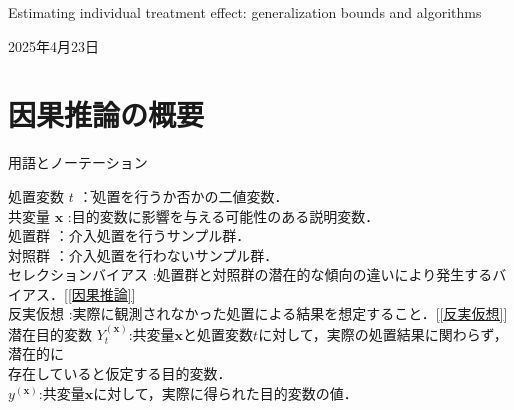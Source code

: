 \documentclass[dvipdfmx]{jreport}
\begin{document}
\begin{center}
    \large{Estimating individual treatment effect: generalization bounds and algorithms}
\end{center}

\begin{flushright}
    2025年4月23日
\end{flushright}

\section{因果推論の概要}
\begin{itembox}[l]{\large{用語とノーテーション}}
    \begin{tabbing}
        \hspace{15pt} \raisebox{0.5ex}{\tiny $\bullet$} 処置変数 $t$ \hspace{50pt}\=：処置を行うか否かの二値変数．\\[0.5em] 
        \hspace{15pt} \raisebox{0.5ex}{\tiny $\bullet$} 共変量 $\boldsymbol{x}$ \>:目的変数に影響を与える可能性のある説明変数．\\[0.5em] 
        \hspace{15pt} \raisebox{0.5ex}{\tiny $\bullet$} 処置群 \>：介入処置を行うサンプル群．\\[0.5em]
        \hspace{15pt} \raisebox{0.5ex}{\tiny $\bullet$} 対照群 \>：介入処置を行わないサンプル群．\\[0.5em]        
        \hspace{15pt} \raisebox{0.5ex}{\tiny $\bullet$} セレクションバイアス \>:処置群と対照群の潜在的な傾向の違いにより発生するバイアス．[\ref{因果推論}]\\[0.5em] 
        \hspace{15pt} \raisebox{0.5ex}{\tiny $\bullet$} 反実仮想 \>:実際に観測されなかった処置による結果を想定すること．[\ref{反実仮想}]\\[0.5em]
        \hspace{15pt} \raisebox{0.5ex}{\tiny $\bullet$} 潜在目的変数 $Y_t^{(\boldsymbol{x})}$\>:共変量$\boldsymbol{x}$と処置変数$t$に対して，実際の処置結果に関わらず，潜在的に\\[0.5em]\>\hspace{6.5pt}存在していると仮定する目的変数．\\[0.5em] 
        \hspace{15pt} \raisebox{0.5ex}{\tiny $\bullet$} $y^{(\boldsymbol{x})}$\>:共変量$\boldsymbol{x}$に対して，実際に得られた目的変数の値．\\[0.5em] 

\end{tabbing}
\end{itembox}
\end{document}
